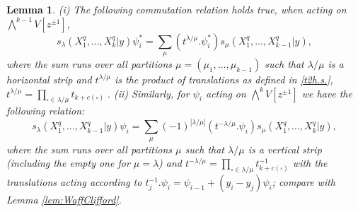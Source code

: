 \documentclass[12pt]{amsart}
\newtheorem{lemma}[prop]{Lemma}
\numberwithin{equation}{section}
\numberwithin{figure}{section}
\begin{document}
\begin{lemma}
        (i) The following commutation relation holds true, when acting on $\bigwedge^{k-1}V[z^{\pm1}]$,
        \begin{equation}
        \label{fschurcom}
            s_{\lambda}(X^q_1,\ldots,X_k^q | y) \psi^*_i = \sum_{\mu}  (t^{\lambda/\mu}.\psi^*_{i}) s_{\mu}(X^q_1,\ldots, X^q_{k-1}|y),
        \end{equation}
        where the sum runs over all partitions $\mu=(\mu_1,\ldots,\mu_{k-1})$ such that $\lambda/\mu$ is a horizontal strip and $t^{\lambda/\mu}$ is the product of translations as defined in \eqref{t2h.s.}, 
        $
            t^{\lambda/\mu}=\prod\limits_{\square \in \lambda /\mu} t_{k + c(\square)}\;.
        $
 (ii) Similarly, for $\psi_i$ acting on $\bigwedge^{k}V[z^{\pm 1}]$ we have the following relation:
        \begin{equation} 
        \label{commpsi}
            s_{\lambda}(X_1^q, \ldots , X_{k-1}^q|y) \psi_i = \sum\limits_{\mu} (-1)^{|\lambda/\mu|} (t^{-\lambda/\mu}.\psi_i) s_{\mu}(X_1^q, \ldots, X_k^q|y),
    \end{equation}
    where the sum runs over all partitions $\mu$ such that $\lambda/\mu$ is a vertical strip (including the empty one for $\mu=\lambda$) and $t^{-\lambda / \mu} = \prod\limits_{\square \in \lambda / \mu}t^{-1}_{k + c(\square)}$ with the translations acting according to %
    $t^{-1}_j. \psi_i = \psi_{i - 1} + (y_i - y_j) \psi_i$; compare with Lemma \ref{lem:WaffClifford}.
    \end{lemma}
\end{document}
